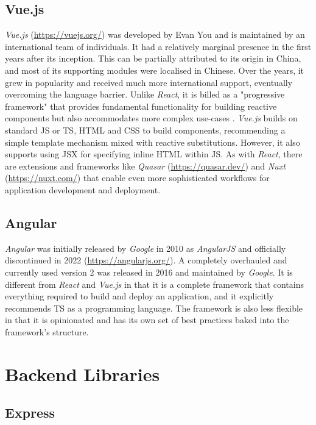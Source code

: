 \subsection{Vue.js}

\emph{Vue.js} (\url{https://vuejs.org/}) was developed by Evan You and is maintained by an international team of individuals. It had a relatively marginal presence in the first years after its inception. This can be partially attributed to its origin in China, and most of its supporting modules were localised in Chinese. Over the years, it grew in popularity and received much more international support, eventually overcoming the language barrier. Unlike \emph{React}, it is billed as a "progressive framework" that provides fundamental functionality for building reactive components but also accommodates more complex use-cases \parencite{vueProgressiveFramework}. \emph{Vue.js} builds on standard \ac{JS} or \ac{TS}, \ac{HTML} and \ac{CSS} to build components, recommending a simple template mechanism mixed with reactive substitutions. However, it also supports using \ac{JSX} for specifying inline \ac{HTML} within \ac{JS}. As with \emph{React}, there are extensions and frameworks like \emph{Quasar} (\url{https://quasar.dev/}) and \emph{Nuxt} (\url{https://nuxt.com/}) that enable even more sophisticated workflows for application development and deployment.

\subsection{Angular}

\emph{Angular} was initially released by \emph{Google} in 2010 as \emph{AngularJS}  and officially discontinued in 2022 (\url{https://angularjs.org/}). A completely overhauled and currently used version 2 was released in 2016 and maintained by \emph{Google}. It is different from \emph{React} and \emph{Vue.js} in that it is a complete framework that contains everything required to build and deploy an application, and it explicitly recommends \ac{TS} as a programming language. The framework is also less flexible in that it is opinionated and has its own set of best practices baked into the framework's structure.




\section{Backend Libraries}

\subsection{Express}

